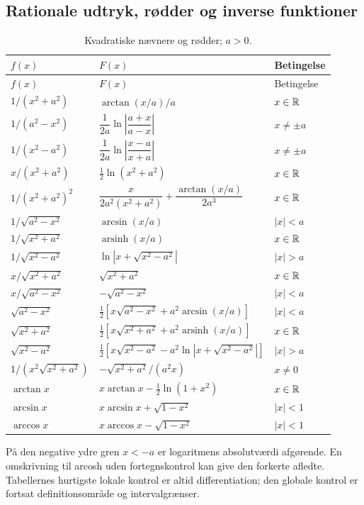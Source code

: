 \subsection{Rationale udtryk, rødder og inverse funktioner}
\begin{longtable}{@{}p{}p{}p{}@{}}
\caption{Kvadratiske nævnere og rødder; $a>0$.}\\
\toprule $f(x)$ & $F(x)$ & Betingelse\\\midrule\endfirsthead
\toprule $f(x)$ & $F(x)$ & Betingelse\\\midrule\endhead
$1/(x^2+a^2)$ & $\arctan(x/a)/a$ & $x\in\mathbb{R}$\\[2mm]
$1/(a^2-x^2)$ & $\dfrac1{2a}\ln\left|\dfrac{a+x}{a-x}\right|$ & $x\ne\pm a$\\[3mm]
$1/(x^2-a^2)$ & $\dfrac1{2a}\ln\left|\dfrac{x-a}{x+a}\right|$ & $x\ne\pm a$\\[3mm]
$x/(x^2+a^2)$ & $\tfrac12\ln(x^2+a^2)$ & $x\in\mathbb{R}$\\[2mm]
$1/(x^2+a^2)^2$ & $\dfrac{x}{2a^2(x^2+a^2)}+\dfrac{\arctan(x/a)}{2a^3}$ & $x\in\mathbb{R}$\\[3mm]
$1/\sqrt{a^2-x^2}$ & $\arcsin(x/a)$ & $|x|<a$\\[2mm]
$1/\sqrt{x^2+a^2}$ & $\operatorname{arsinh}(x/a)$ & $x\in\mathbb{R}$\\[2mm]
$1/\sqrt{x^2-a^2}$ & $\ln|x+\sqrt{x^2-a^2}|$ & $|x|>a$\\[2mm]
$x/\sqrt{x^2+a^2}$ & $\sqrt{x^2+a^2}$ & $x\in\mathbb{R}$\\[2mm]
$x/\sqrt{a^2-x^2}$ & $-\sqrt{a^2-x^2}$ & $|x|<a$\\[2mm]
$\sqrt{a^2-x^2}$ & $\tfrac12[x\sqrt{a^2-x^2}+a^2\arcsin(x/a)]$ & $|x|<a$\\[2mm]
$\sqrt{x^2+a^2}$ & $\tfrac12[x\sqrt{x^2+a^2}+a^2\operatorname{arsinh}(x/a)]$ & $x\in\mathbb{R}$\\[2mm]
$\sqrt{x^2-a^2}$ & $\tfrac12[x\sqrt{x^2-a^2}-a^2\ln|x+\sqrt{x^2-a^2}|]$ & $|x|>a$\\[2mm]
$1/(x^2\sqrt{x^2+a^2})$ & $-\sqrt{x^2+a^2}/(a^2x)$ & $x\ne0$\\[2mm]
$\arctan x$ & $x\arctan x-\tfrac12\ln(1+x^2)$ & $x\in\mathbb{R}$\\[2mm]
$\arcsin x$ & $x\arcsin x+\sqrt{1-x^2}$ & $|x|<1$\\[2mm]
$\arccos x$ & $x\arccos x-\sqrt{1-x^2}$ & $|x|<1$\\
\bottomrule
\end{longtable}
På den negative ydre gren $x<-a$ er logaritmens absolutværdi afgørende.
En omskrivning til arcosh uden fortegnskontrol kan give den forkerte
afledte. Tabellernes hurtigste lokale kontrol er altid differentiation;
den globale kontrol er fortsat definitionsområde og intervalgrænser.

